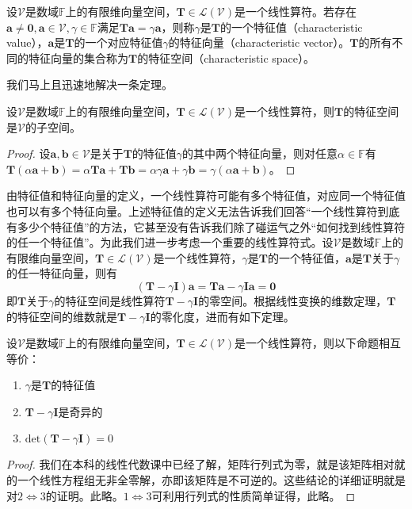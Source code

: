 \documentclass[main.tex]{subfiles}
\begin{document}
\begin{definition}
设$\mathcal{V}$是数域$\mathbb{F}$上的有限维向量空间，$\mathbf{T}\in\mathcal{L}\left(\mathcal{V}\right)$是一个线性算符。若存在$\mathbf{a}\neq\mathbf{0},\mathbf{a}\in\mathcal{V},\gamma\in\mathbb{F}$满足$\mathbf{Ta}=\gamma\mathbf{a}$，则称$\gamma$是$\mathbf{T}$的一个特征值（characteristic value），$\mathbf{a}$是$\mathbf{T}$的一个对应特征值$\gamma$的特征向量（characteristic vector）。$\mathbf{T}$的所有不同的特征向量的集合称为$\mathbf{T}$的特征空间（characteristic space）。
\end{definition}

我们马上且迅速地解决一条定理。

\begin{theorem}
设$\mathcal{V}$是数域$\mathbb{F}$上的有限维向量空间，$\mathbf{T}\in\mathcal{L}\left(\mathcal{V}\right)$是一个线性算符，则$\mathbf{T}$的特征空间是$\mathcal{V}$的子空间。
\end{theorem}
\begin{proof}
设$\mathbf{a},\mathbf{b}\in\mathcal{V}$是关于$\mathbf{T}$的特征值$\gamma$的其中两个特征向量，则对任意$\alpha\in\mathbb{F}$有$\mathbf{T}\left(\alpha\mathbf{a}+\mathbf{b}\right)=\alpha\mathbf{Ta}+\mathbf{Tb}=\alpha\gamma\mathbf{a}+\gamma\mathbf{b}=\gamma\left(\alpha\mathbf{a}+\mathbf{b}\right)$。
\end{proof}

由特征值和特征向量的定义，一个线性算符可能有多个特征值，对应同一个特征值也可以有多个特征向量。上述特征值的定义无法告诉我们回答“一个线性算符到底有多少个特征值”的方法，它甚至没有告诉我们除了碰运气之外“如何找到线性算符的任一个特征值”。为此我们进一步考虑一个重要的线性算符式。设$\mathcal{V}$是数域$\mathbb{F}$上的有限维向量空间，$\mathbf{T}\in\mathcal{L}\left(\mathcal{V}\right)$是一个线性算符，$\gamma$是$\mathbf{T}$的一个特征值，$\mathbf{a}$是$\mathbf{T}$关于$\gamma$的任一特征向量，则有
\[\left(\mathbf{T}-\gamma\mathbf{I}\right)\mathbf{a}=\mathbf{Ta}-\gamma\mathbf{Ia}=\mathbf{0}\]
即$\mathbf{T}$关于$\gamma$的特征空间是线性算符$\mathbf{T}-\gamma\mathbf{I}$的零空间。根据线性变换的维数定理，$\mathbf{T}$的特征空间的维数就是$\mathbf{T}-\gamma\mathbf{I}$的零化度，进而有如下定理。

\begin{theorem}
设$\mathcal{V}$是数域$\mathbb{F}$上的有限维向量空间，$\mathbf{T}\in\mathcal{L}\left(\mathcal{V}\right)$是一个线性算符，则以下命题相互等价：
\begin{enumerate}
    \item $\gamma$是$\mathbf{T}$的特征值
    \item $\mathbf{T}-\gamma\mathbf{I}$是奇异的
    \item $\mathrm{det}\left(\mathbf{T}-\gamma\mathbf{I}\right)=0$
\end{enumerate}
\begin{proof}
我们在本科的线性代数课中已经了解，矩阵行列式为零，就是该矩阵相对就的一个线性方程组无非全零解，亦即该矩阵是不可逆的。这些结论的详细证明就是对$2\Leftrightarrow 3$的证明。此略。$1\Leftrightarrow 3$可利用行列式的性质简单证得，此略。
\end{proof}
\end{theorem}
\end{document}
